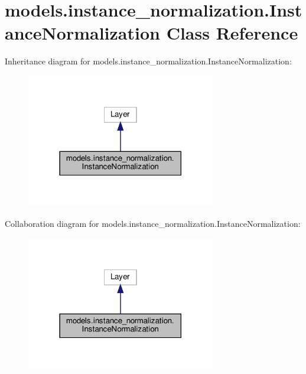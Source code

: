 \hypertarget{classmodels_1_1instance__normalization_1_1InstanceNormalization}{}\section{models.\+instance\+\_\+normalization.\+Instance\+Normalization Class Reference}
\label{classmodels_1_1instance__normalization_1_1InstanceNormalization}


Inheritance diagram for models.\+instance\+\_\+normalization.\+Instance\+Normalization\+:
\nopagebreak
\begin{figure}[H]
\begin{center}
\leavevmode
\includegraphics[width=234pt]{classmodels_1_1instance__normalization_1_1InstanceNormalization__inherit__graph}
\end{center}
\end{figure}


Collaboration diagram for models.\+instance\+\_\+normalization.\+Instance\+Normalization\+:
\nopagebreak
\begin{figure}[H]
\begin{center}
\leavevmode
\includegraphics[width=234pt]{classmodels_1_1instance__normalization_1_1InstanceNormalization__coll__graph}
\end{center}
\end{figure}
